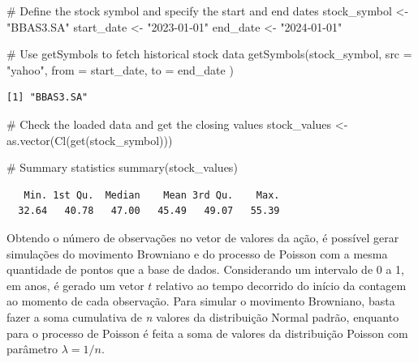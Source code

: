 \documentclass[
  letterpaper,
  DIV=11,
  numbers=noendperiod]{scrreprt}
\newenvironment{Shaded}{\begin{snugshade}}{\end{snugshade}}
\newcommand{\AttributeTok}[1]{\textcolor[rgb]{0.40,0.45,0.13}{#1}}
\newcommand{\CommentTok}[1]{\textcolor[rgb]{0.37,0.37,0.37}{#1}}
\newcommand{\FunctionTok}[1]{\textcolor[rgb]{0.28,0.35,0.67}{#1}}
\newcommand{\NormalTok}[1]{\textcolor[rgb]{0.00,0.23,0.31}{#1}}
\newcommand{\OtherTok}[1]{\textcolor[rgb]{0.00,0.23,0.31}{#1}}
\newcommand{\StringTok}[1]{\textcolor[rgb]{0.13,0.47,0.30}{#1}}
\begin{document}
\begin{Shaded}
\begin{Highlighting}[]
\CommentTok{\# Define the stock symbol and specify the start and end dates}
\NormalTok{stock\_symbol }\OtherTok{\textless{}{-}} \StringTok{"BBAS3.SA"}
\NormalTok{start\_date }\OtherTok{\textless{}{-}} \StringTok{"2023{-}01{-}01"}
\NormalTok{end\_date }\OtherTok{\textless{}{-}} \StringTok{"2024{-}01{-}01"}

\CommentTok{\# Use getSymbols to fetch historical stock data}
\FunctionTok{getSymbols}\NormalTok{(stock\_symbol,}
    \AttributeTok{src =} \StringTok{"yahoo"}\NormalTok{,}
    \AttributeTok{from =}\NormalTok{ start\_date,}
    \AttributeTok{to =}\NormalTok{ end\_date}
\NormalTok{)}
\end{Highlighting}
\end{Shaded}

\begin{verbatim}
[1] "BBAS3.SA"
\end{verbatim}

\begin{Shaded}
\begin{Highlighting}[]
\CommentTok{\# Check the loaded data and get the closing values}
\NormalTok{stock\_values }\OtherTok{\textless{}{-}} \FunctionTok{as.vector}\NormalTok{(}\FunctionTok{Cl}\NormalTok{(}\FunctionTok{get}\NormalTok{(stock\_symbol)))}

\CommentTok{\# Summary statistics}
\FunctionTok{summary}\NormalTok{(stock\_values)}
\end{Highlighting}
\end{Shaded}

\begin{verbatim}
   Min. 1st Qu.  Median    Mean 3rd Qu.    Max. 
  32.64   40.78   47.00   45.49   49.07   55.39 
\end{verbatim}

Obtendo o número de observações no vetor de valores da ação, é possível
gerar simulações do movimento Browniano e do processo de Poisson com a
mesma quantidade de pontos que a base de dados. Considerando um
intervalo de 0 a 1, em anos, é gerado um vetor \(t\) relativo ao tempo
decorrido do início da contagem ao momento de cada observação. Para
simular o movimento Browniano, basta fazer a soma cumulativa de \emph{n}
valores da distribuição Normal padrão, enquanto para o processo de
Poisson é feita a soma de valores da distribuição Poisson com parâmetro
\(\lambda=1/n\).
\end{document}
